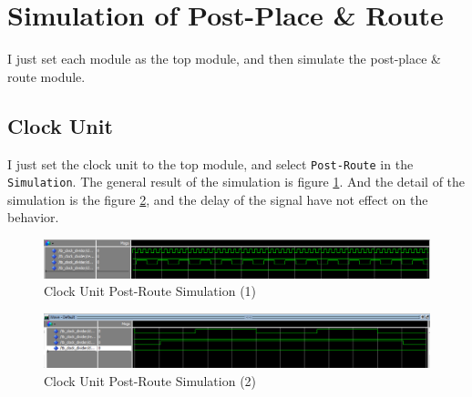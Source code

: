 \documentclass{article}
\begin{document}
    \section{Simulation of Post-Place \& Route}
    \label{sec:postsimulation}
    
    I just set each module as the top module, and then simulate the post-place \& route module.
    
    \subsection{Clock Unit}
    \label{sec:ppr:clockunit}
    
    I just set the clock unit to the top module, and select \verb|Post-Route| in the \verb|Simulation|.
    The general result of the simulation is figure \ref{fig:homework3-10}.
    And the detail of the simulation is the figure \ref{fig:homework3-11}, and the delay of the signal
    have not effect on the behavior.
    
    \begin{figure}
\centering
\includegraphics[width=1\linewidth]{homework3-10}
\caption{Clock Unit Post-Route Simulation (1)}
\label{fig:homework3-10}
    \end{figure}

    \begin{figure}
\centering
\includegraphics[width=1\linewidth]{homework3-11}
\caption{Clock Unit Post-Route Simulation (2)}
\label{fig:homework3-11}
    \end{figure}




    
\end{document}
